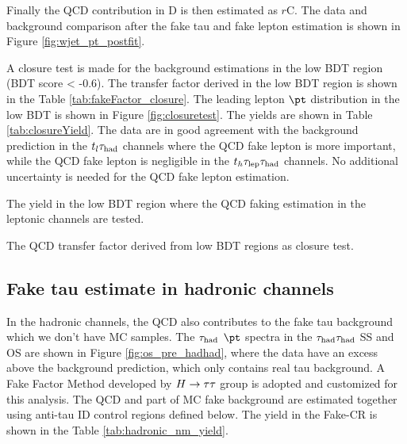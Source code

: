 Finally the QCD contribution in D is then estimated as $r$C.
The data and background comparison after the fake tau and fake lepton estimation is shown in Figure \ref{fig:wjet_pt_postfit}.


A closure test is made for the background estimations in the low BDT region (BDT score < -0.6). The transfer factor derived in the low BDT region is shown in the Table \ref{tab:fakeFactor_closure}. The leading lepton $\pt$ distribution in the low BDT is shown in Figure \ref{fig:closuretest}. The yields are shown in Table \ref{tab:closureYield}. The data are in good agreement with the background prediction in the
$t_l\tau_\text{had}$ channels where the QCD fake lepton is more important, while the QCD fake lepton is negligible in the $t_h\tau_\text{lep}{}\tau_\text{had}$ channels. No additional uncertainty is needed for the QCD fake lepton estimation.    




\begin{table}
\caption{The yield in the low BDT region where the QCD faking estimation in the leptonic channels are tested.}
\label{tab:closureYield}

\end{table}


\begin{table}
\caption{The QCD transfer factor derived from low BDT regions as closure test.}
\label{tab:fakeFactor_closure}

\end{table}

\newpage
\subsection{Fake tau estimate in hadronic channels}
\label{sec:ss_method}

In the hadronic channels, the QCD also contributes to the fake tau background which we don't have MC samples. The $\tau_\text{had}$ $\pt$ spectra in the $\tau_\text{had}{}\tau_\text{had}$ SS and OS are shown in Figure \ref{fig:os_pre_hadhad}, where the data have an excess above the background prediction, which only contains real tau background. A Fake Factor Method developed by $H \rightarrow \tau\tau$ group \cite{Htautau-note} is adopted and customized for this analysis. The QCD and part of MC fake background are estimated together using anti-tau ID control regions defined below. The yield in the Fake-CR is shown in the Table \ref{tab:hadronic_nm_yield}. 

